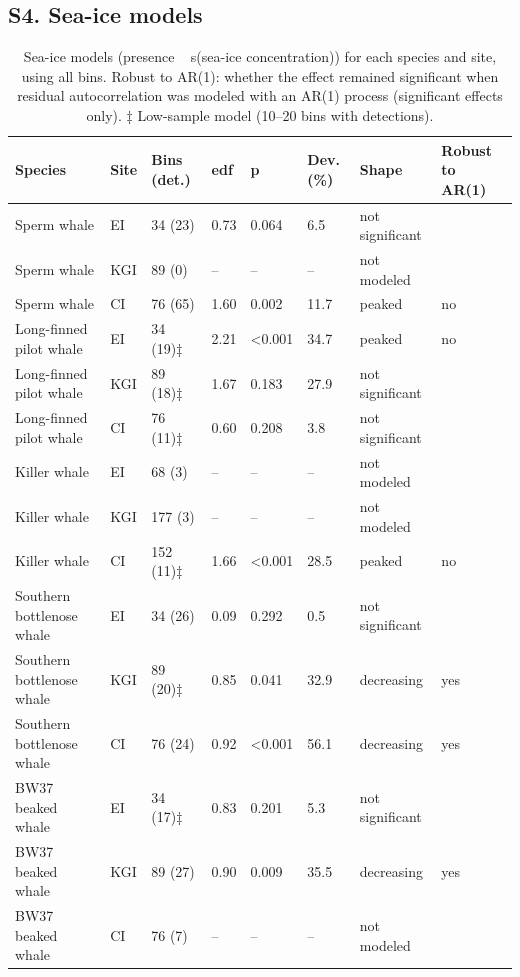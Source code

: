 \documentclass[
  11pt,
]{article}
\begin{document}
\subsection*{S4. Sea-ice models}\label{s4.-sea-ice-models}

\begin{table}[!h]
\centering
\caption{\label{tab:seaice}Sea-ice models (presence ~ s(sea-ice concentration)) for each species and site, using all bins. Robust to AR(1): whether the effect remained significant when residual autocorrelation was modeled with an AR(1) process (significant effects only). ‡ Low-sample model (10--20 bins with detections).}
\centering
\fontsize{8}{10}\selectfont
\begin{tabular}[t]{llllllll}
\toprule
Species & Site & Bins (det.) & edf & p & Dev. (\%) & Shape & Robust to AR(1)\\
\midrule
Sperm whale & EI & 34 (23) & 0.73 & 0.064 & 6.5 & not significant & \\
Sperm whale & KGI & 89 (0) & -- & -- & -- & not modeled & \\
Sperm whale & CI & 76 (65) & 1.60 & 0.002 & 11.7 & peaked & no\\
Long-finned pilot whale & EI & 34 (19)‡ & 2.21 & <0.001 & 34.7 & peaked & no\\
Long-finned pilot whale & KGI & 89 (18)‡ & 1.67 & 0.183 & 27.9 & not significant & \\
Long-finned pilot whale & CI & 76 (11)‡ & 0.60 & 0.208 & 3.8 & not significant & \\
Killer whale & EI & 68 (3) & -- & -- & -- & not modeled & \\
Killer whale & KGI & 177 (3) & -- & -- & -- & not modeled & \\
Killer whale & CI & 152 (11)‡ & 1.66 & <0.001 & 28.5 & peaked & no\\
Southern bottlenose whale & EI & 34 (26) & 0.09 & 0.292 & 0.5 & not significant & \\
Southern bottlenose whale & KGI & 89 (20)‡ & 0.85 & 0.041 & 32.9 & decreasing & yes\\
Southern bottlenose whale & CI & 76 (24) & 0.92 & <0.001 & 56.1 & decreasing & yes\\
BW37 beaked whale & EI & 34 (17)‡ & 0.83 & 0.201 & 5.3 & not significant & \\
BW37 beaked whale & KGI & 89 (27) & 0.90 & 0.009 & 35.5 & decreasing & yes\\
BW37 beaked whale & CI & 76 (7) & -- & -- & -- & not modeled & \\
\bottomrule
\end{tabular}
\end{table}
\end{document}
